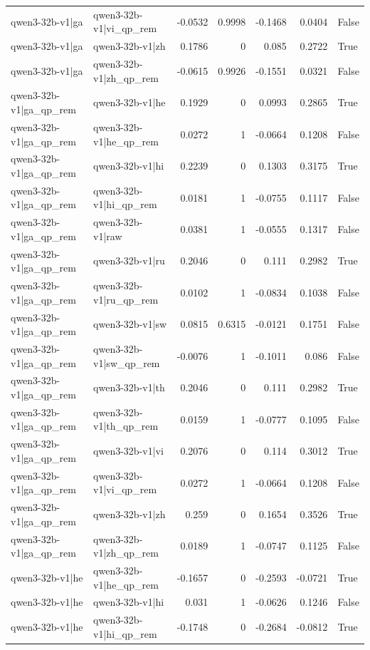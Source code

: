 \begin{table}
\begin{tabular}{l l r r r r l}
qwen3-32b-v1|ga & qwen3-32b-v1|vi_qp_rem & -0.0532 & 0.9998 & -0.1468 & 0.0404 & False \\
qwen3-32b-v1|ga & qwen3-32b-v1|zh & 0.1786 & 0 & 0.085 & 0.2722 & True \\
qwen3-32b-v1|ga & qwen3-32b-v1|zh_qp_rem & -0.0615 & 0.9926 & -0.1551 & 0.0321 & False \\
qwen3-32b-v1|ga_qp_rem & qwen3-32b-v1|he & 0.1929 & 0 & 0.0993 & 0.2865 & True \\
qwen3-32b-v1|ga_qp_rem & qwen3-32b-v1|he_qp_rem & 0.0272 & 1 & -0.0664 & 0.1208 & False \\
qwen3-32b-v1|ga_qp_rem & qwen3-32b-v1|hi & 0.2239 & 0 & 0.1303 & 0.3175 & True \\
qwen3-32b-v1|ga_qp_rem & qwen3-32b-v1|hi_qp_rem & 0.0181 & 1 & -0.0755 & 0.1117 & False \\
qwen3-32b-v1|ga_qp_rem & qwen3-32b-v1|raw & 0.0381 & 1 & -0.0555 & 0.1317 & False \\
qwen3-32b-v1|ga_qp_rem & qwen3-32b-v1|ru & 0.2046 & 0 & 0.111 & 0.2982 & True \\
qwen3-32b-v1|ga_qp_rem & qwen3-32b-v1|ru_qp_rem & 0.0102 & 1 & -0.0834 & 0.1038 & False \\
qwen3-32b-v1|ga_qp_rem & qwen3-32b-v1|sw & 0.0815 & 0.6315 & -0.0121 & 0.1751 & False \\
qwen3-32b-v1|ga_qp_rem & qwen3-32b-v1|sw_qp_rem & -0.0076 & 1 & -0.1011 & 0.086 & False \\
qwen3-32b-v1|ga_qp_rem & qwen3-32b-v1|th & 0.2046 & 0 & 0.111 & 0.2982 & True \\
qwen3-32b-v1|ga_qp_rem & qwen3-32b-v1|th_qp_rem & 0.0159 & 1 & -0.0777 & 0.1095 & False \\
qwen3-32b-v1|ga_qp_rem & qwen3-32b-v1|vi & 0.2076 & 0 & 0.114 & 0.3012 & True \\
qwen3-32b-v1|ga_qp_rem & qwen3-32b-v1|vi_qp_rem & 0.0272 & 1 & -0.0664 & 0.1208 & False \\
qwen3-32b-v1|ga_qp_rem & qwen3-32b-v1|zh & 0.259 & 0 & 0.1654 & 0.3526 & True \\
qwen3-32b-v1|ga_qp_rem & qwen3-32b-v1|zh_qp_rem & 0.0189 & 1 & -0.0747 & 0.1125 & False \\
qwen3-32b-v1|he & qwen3-32b-v1|he_qp_rem & -0.1657 & 0 & -0.2593 & -0.0721 & True \\
qwen3-32b-v1|he & qwen3-32b-v1|hi & 0.031 & 1 & -0.0626 & 0.1246 & False \\
qwen3-32b-v1|he & qwen3-32b-v1|hi_qp_rem & -0.1748 & 0 & -0.2684 & -0.0812 & True \\

\end{tabular}
\end{table}
